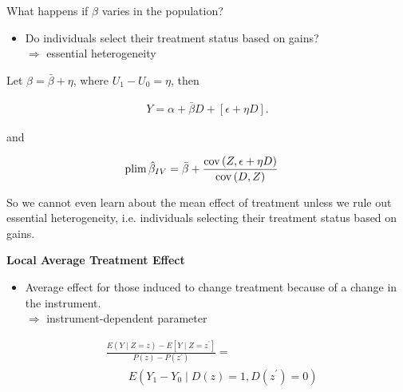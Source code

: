 \begin{frame}
What happens if $\beta$ varies in the population?\vspace{0.3cm}
\begin{itemize}\setlength\itemsep{1em}
\item Do individuals select their treatment status based on gains?\\\vspace{0.2cm}\hspace{0.3cm}$\Rightarrow$ essential heterogeneity
\end{itemize}
\end{frame}
\begin{frame}
Let $\beta = \bar{\beta} + \eta$, where $U_1 - U_0 = \eta$, then

\begin{align*}
Y = \alpha + \bar{\beta} D + [\epsilon + \eta D].
\end{align*}

and

\begin{align*}
\mathrm{plim}\thinspace \hat{\beta}_{IV} & = \bar{\beta} + \frac{\mathrm{cov}\thinspace(Z, \epsilon + \eta D)}{\mathrm{cov}\thinspace(D, Z)}
\end{align*}

So we cannot even learn about the mean effect of treatment unless we rule out essential heterogeneity, i.e. individuals selecting their treatment status based on gains.
\end{frame}
\begin{frame}\textbf{Local Average Treatment Effect}\vspace{0.3cm}
\begin{itemize}\setlength\itemsep{1em}
\item Average effect for those induced
to change treatment because of a change in the instrument.\\\vspace{0.2cm}
\(\Rightarrow\) instrument-dependent parameter\vspace{0.4cm}
\end{itemize}

\begin{align*}
&\frac{E(Y\mid Z = z) - E[Y \mid Z = z^\prime]}{P(z) - P(z^\prime)} = \\
 &\qquad E(Y_1 - Y_0\mid D(z) = 1, D(z^\prime) = 0)
\end{align*}

\end{frame}

